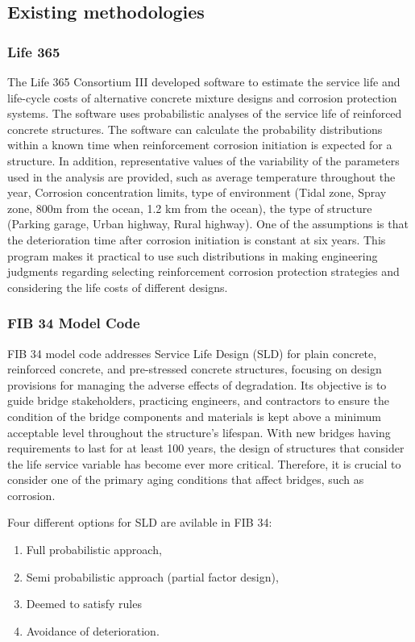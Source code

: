 \subsection{Existing methodologies}

\subsubsection{Life 365}
The Life 365 Consortium III developed software to estimate the service life and life-cycle costs of alternative concrete mixture designs and corrosion protection systems\cite{Bentz2003}. The software uses probabilistic analyses of the service life of reinforced concrete structures. The software can calculate the probability distributions within a known time when reinforcement corrosion initiation is expected for a structure. In addition, representative values of the variability of the parameters used in the analysis are provided, such as average temperature throughout the year, Corrosion concentration limits, type of environment (Tidal zone, Spray zone, 800m from the ocean, 1.2 km from the ocean), the type of structure (Parking garage, Urban highway, Rural highway). One of the assumptions is that the deterioration time after corrosion initiation is constant at six years. This program makes it practical to use such distributions in making engineering judgments regarding selecting reinforcement corrosion protection strategies and considering the life costs of different designs. 

\subsubsection{FIB 34 Model Code}
FIB 34 model code addresses Service Life Design (SLD) for plain concrete, reinforced concrete, and pre-stressed concrete structures, focusing on design provisions for managing the adverse effects of degradation. Its objective is to guide bridge stakeholders, practicing engineers, and contractors to ensure the condition of the bridge components and materials is kept above a minimum acceptable level throughout the structure's lifespan. With new bridges having requirements to last for at least 100 years, the design of structures that consider the life service variable has become ever more critical. Therefore, it is crucial to consider one of the primary aging conditions that affect bridges, such as corrosion.

Four different options for SLD are avilable in FIB 34:
\begin{enumerate}
    \item Full probabilistic approach,
    \item Semi probabilistic approach (partial factor design),
    \item Deemed to satisfy rules
    \item Avoidance of deterioration.
\end{enumerate}


